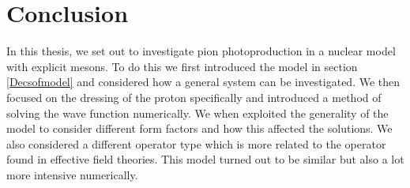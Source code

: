 \chapter{Conclusion}
In this thesis, we set out to investigate pion photoproduction in a nuclear model with explicit mesons. To do this we first introduced the model in section \ref{Decsofmodel} and considered how a general system can be investigated. We then focused on the dressing of the proton specifically and introduced a method of solving the wave function numerically. We when exploited the generality of the model to consider different form factors and how this affected the solutions. We also considered a different operator type which is more related to the operator found in effective field theories. This model turned out to be similar but also a lot more intensive numerically. 
